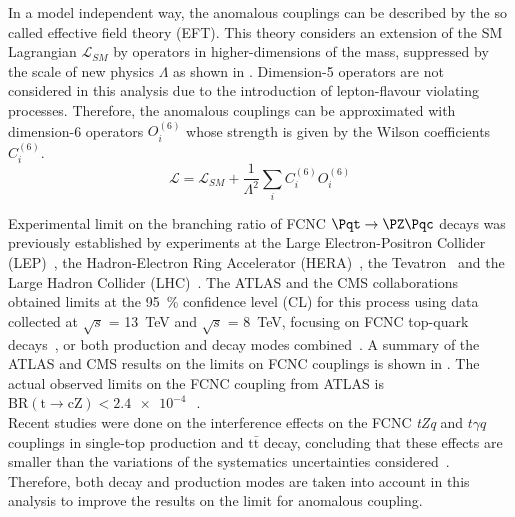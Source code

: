 \noindent In a model independent way, the anomalous couplings can be described by the so called effective field theory (EFT).
This theory considers an extension of the SM Lagrangian $\mathcal{L}_{SM}$ by operators in higher-dimensions of the mass, suppressed by the scale of new physics $\Lambda$ as shown in .
Dimension-5 operators are not considered in this analysis due to the introduction of lepton-flavour violating processes. 
Therefore, the anomalous couplings can be approximated with dimension-6 operators $O_{i}^{(6)}$ whose strength  is given by the Wilson coefficients $C_{i}^{(6)}$.\\

\begin{equation}
\mathcal{L} = \mathcal{L}_{SM} + \frac{1}{\Lambda^2}\sum_{i} C_{i}^{(6)} O_{i}^{(6)}  
\label{eq:lagrangian}
\end{equation}

\noindent Experimental limit on the branching ratio of FCNC $\mathrm{\Pqt\rightarrow\PZ\Pqc}$ decays was previously established by experiments at the Large Electron-Positron Collider (LEP)~\cite{ALEPH,DELPHI,OPAL,L3}, the Hadron-Electron Ring Accelerator (HERA)~\cite{ZEUS}, the Tevatron\ \cite{CDF,DZero} and the Large Hadron Collider (LHC)~\cite{TOPQ-2017-06,Chatrchyan:2013nwa,CMS-TOP-12-039}. The ATLAS and the CMS collaborations obtained limits at the \SI{95}{\percent} confidence level (CL) for this process using data collected at $\sqrt{s}$ = \SI{13}{\TeV} and $\sqrt{s}$ = \SI{8}{\TeV}, focusing on FCNC top-quark decays~\cite{TOPQ-2017-06,Chatrchyan:2013nwa}, or both production and decay modes combined~\cite{CMS-TOP-12-039}. 
A summary of the ATLAS and CMS results on the limits on FCNC couplings is shown in . The actual observed limits on the FCNC \tZc coupling from ATLAS is $\mathrm{BR(t\to cZ) < \SI{2.4e-4}{}}$~\cite{TOPQ-2017-06}.\\
Recent studies were done on the interference effects on the FCNC \textit{tZq} and $t\gamma q$ couplings in single-top production and $\mathrm{t\bar{t}}$ decay, concluding that these effects are smaller than the variations of the systematics uncertainties considered~\cite{Interference}. Therefore, both decay and production modes are taken into account in this analysis to improve the results on the limit for \tZc anomalous coupling.


